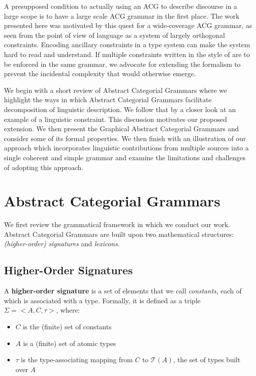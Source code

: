 \documentclass{llncs}
\begin{document}
A presupposed condition to actually using an ACG to describe discourse in a
large scope is to have a large scale ACG grammar in the first place. The work
presented here was motivated by this quest for a wide-coverage ACG grammar, as
seen from the point of view of language as a system of largely orthogonal
constraints. Encoding ancillary constraints in a type system can make the
system hard to read and understand. If multiple constraints written in the
style of \cite{pogodalla2012controlling} are to be enforced in the same
grammar, we advocate for extending the formalism to prevent the incidental
complexity that would otherwise emerge.

We begin with a short review of Abstract Categorial Grammars where we
highlight the ways in which Abstract Categorial Grammars facilitate
decomposition of linguistic description. We follow that by a closer look at an
example of a linguistic constraint. This discussion motivates our proposed
extension. We then present the Graphical Abstract Categorial Grammars and
consider some of its formal properties. We then finish with an illustration of
our approach which incorporates linguistic contributions from multiple sources
into a single coherent and simple grammar and examine the limitations and
challenges of adopting this approach.


\section{Abstract Categorial Grammars}
\label{sec:acg-comp}

We first review the grammatical framework in which we conduct our
work. Abstract Categorial Grammars are built upon two mathematical structures:
\emph{(higher-order) signatures} and \emph{lexicons}.

\subsection{Higher-Order Signatures}
\label{ssec:sig}

A \textbf{higher-order signature} is a set of elements that we call
\emph{constants}, each of which is associated with a type. Formally, it
is defined as a triple $\Sigma = \mathopen{<}A, C, \tau\mathclose{>}$,
where:
\begin{itemize}
  \item $C$ is the (finite) set of constants
  \item $A$ is a (finite) set of atomic types
  \item $\tau$ is the type-associating mapping from $C$ to
    $\mathcal{T}(A)$, the set of types built over $A$
\end{itemize}
\end{document}
